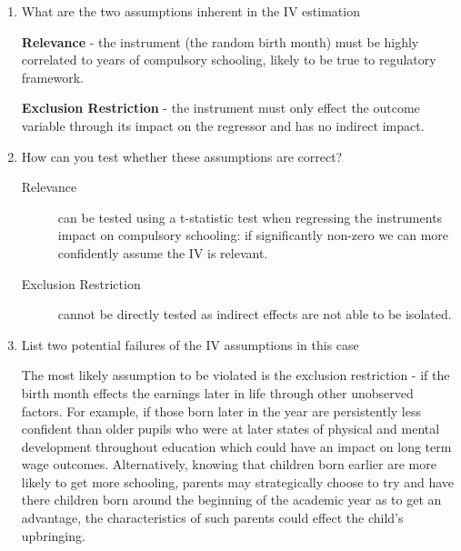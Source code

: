 \documentclass[../Main.tex]{subfiles}
\begin{document}
\begin{refsection}
\begin{enumerate}
\begin{enumerate}
        \item What are the two assumptions inherent in the IV estimation

        \begin{answer}
            
            \textbf{Relevance} - the instrument (the random birth month)
            must be highly correlated to years of compulsory schooling, likely
            to be true to regulatory framework.
            
           \textbf{Exclusion Restriction} - the instrument must only
            effect the outcome variable through its impact on the regressor and
            has no indirect impact.

        \end{answer}
            
        \item How can you test whether these assumptions are correct? 

        \begin{answer}

            \begin{description}
            
                \item[Relevance] can be tested using a t-statistic test when
                regressing the instruments impact on compulsory schooling: if
                significantly
                non-zero we can more confidently assume the IV is relevant.
    
                \item[Exclusion Restriction] cannot be directly tested as
                indirect effects are not able to be isolated.

            \end{description}

        \end{answer}
            
        \item List two potential failures of the IV assumptions in this case

        \begin{answer}
        
        The most likely assumption to be violated is the exclusion
        restriction - if the birth month effects the earnings later in life
        through other unobserved factors. For example, if those born later in
        the year are persistently less confident than older pupils who were at
        later states of physical and mental development throughout education
        which could have an impact on long term wage outcomes. Alternatively,
        knowing that children born earlier are more likely to get more
        schooling, parents may strategically choose to try and have there
        children born around the beginning of the academic year as to get an
        advantage, the characteristics of such parents could effect the child's
        upbringing.


\end{answer}
\end{enumerate}
\end{enumerate}
\end{refsection}
\end{document}
